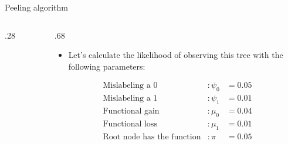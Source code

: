 \documentclass[9pt,ignorenonframetext,aspectratio=169]{beamer}
\providecommand{\tightlist}{%
  \setlength{\itemsep}{0pt}\setlength{\parskip}{0pt}}
\newcommand{\includetikz}[2]{
\begin{figure}
\scalebox{#2}{

}
\end{figure}
}
\def\begincols{\begin{columns}[T]}
\def\begincol{\begin{column}[T]}
\def\endcol{\end{column}}
\def\endcols{\end{columns}}
\begin{document}
\begin{frame}[t]{Peeling algorithm}

\begincols

\begincol{.28\textwidth}

\includetikz{simple_tree.tex}{.5}

\endcol

\begincol{.68\textwidth}

\begin{itemize}
\tightlist
\item
  Let's calculate the likelihood of observing this tree with the
  following parameters:
\end{itemize}

\footnotesize

\normalsize

\[
\begin{aligned}
\mbox{Mislabeling a 0} &: \psi_0 &= 0.05 \\
\mbox{Mislabeling a 1} &:\psi_1 &= 0.01 \\
\mbox{Functional gain} &:\mu_0  &= 0.04  \\
\mbox{Functional loss} &:\mu_1  &= 0.01  \\
\mbox{Root node has the function} &: \pi    &= 0.05  \\
\end{aligned}
\]

\endcol

\endcols

\footnotesize

\normalsize

\end{frame}
\end{document}
